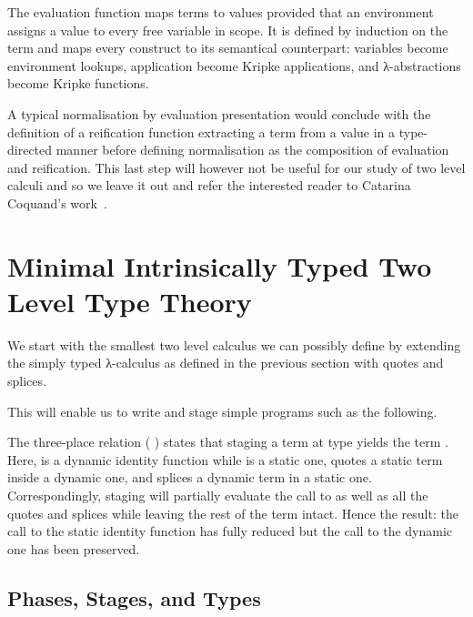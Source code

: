 
The evaluation function maps terms to values provided that
an environment assigns a value to every free variable in scope.
It is defined by induction on the term and maps every construct
to its semantical counterpart: variables become environment lookups,
application become Kripke applications, and λ-abstractions become
Kripke functions.

\begin{AgdaSuppressSpace}
\end{AgdaSuppressSpace}

A typical normalisation by evaluation presentation would
conclude with the definition of a reification function
extracting a term from a value in a type-directed manner
before defining normalisation as the composition of evaluation
and reification.
%
This last step will however not be useful for our study of two level
calculi and so we leave it out and refer the interested
reader to Catarina Coquand's work~\cite{DBLP:journals/lisp/Coquand02}.

\section{Minimal Intrinsically Typed Two Level Type Theory}

We start with the smallest two level calculus we can possibly define
by extending the simply typed λ-calculus as defined in the previous
section with quotes and splices.

This will enable us to write and stage simple programs such as the following.


The three-place relation (    ) states
that staging a term  at type  yields the term .
%
Here,  is a dynamic identity function
while  is a static one,
 quotes a static term inside a dynamic one,
and  splices a dynamic term in a static one.
%
Correspondingly, staging will partially evaluate the call to
 as well as all the quotes and splices while leaving
the rest of the term intact.
%
Hence the result: the call to the static identity function has
fully reduced but the call to the dynamic one has been preserved.


\subsection{Phases, Stages, and Types}


